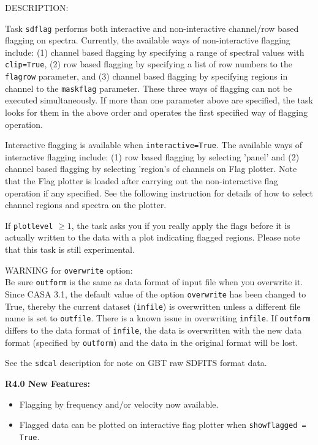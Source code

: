 DESCRIPTION:

Task {\tt sdflag} performs both interactive and non-interactive channel/row 
based flagging on spectra.
Currently, the available ways of non-interactive flagging include: 
(1) channel based flagging by specifying a range of spectral values 
with {\tt clip=True}, (2) row based flagging by specifying a list of row 
numbers to the {\tt flagrow} parameter, and (3) channel based flagging by 
specifying regions in channel to the {\tt maskflag} parameter. 
These three ways of flagging can not be executed simultaneously. 
If more than one parameter above are specified, the task looks for 
them in the above order and operates the first specified way of 
flagging operation.

Interactive flagging is available when {\tt interactive=True}. 
The available ways of interactive flagging include: 
(1) row based flagging by selecting 'panel' and (2) channel
based flagging by selecting 'region's of channels on Flag plotter. 
Note that the Flag plotter is loaded after carrying out the 
non-interactive flag operation if any specified. See the following instruction for
details of how to select channel regions and spectra on the plotter.

If {\tt plotlevel} $ \ge 1 $, the task asks you if you really apply the 
flags before it is actually written to the data with a plot 
indicating flagged regions.
Please note that this task is still experimental.

WARNING for {\tt overwrite} option:\\
Be sure {\tt outform} is the same as data format of input file when you
overwrite it. Since CASA 3.1, the default value of the option {\tt overwrite}
has been changed to True, thereby the current dataset ({\tt infile}) is 
overwritten unless a different file name is set to {\tt outfile}. 
There is a known issue in overwriting {\tt infile}. If {\tt outform} differs to the
data format of {\tt infile}, the data is overwritten with the new data format 
(specified by {\tt outform}) and the data in the original format will be lost.

See the {\tt sdcal} description for note on GBT raw SDFITS format data.

\medskip
{\bf R4.0 New Features:}%
\begin{itemize}
\item Flagging by frequency and/or velocity now available.
\item Flagged data can be plotted on interactive flag plotter 
when {\tt showflagged = True}.
\end{itemize}


